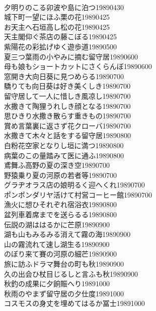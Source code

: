 \begin{multicols}{2}
\\夕明りのこる卯波や島に泊つ\hfill{19890430}
\\城下町一望にほふ栗の花\hfill{19890425}
\\お天主へ石垣高し松の花\hfill{19890425}
\\天主閣仰ぐ茶店の藤こぼる\hfill{19890425}
\\紫陽花の彩拡げゆく遊歩道\hfill{19890500}
\\夏三つ葉雨の小やみに摘む留守居\hfill{19890600}
\\母も娘もショートカットにさくらんぼ\hfill{19890600}
\\窓開き大向日葵に見つめらる\hfill{19890700}
\\驕りても向日葵は好き美くしき\hfill{19890700}
\\留守居して一人に惜しき風凉し\hfill{19890700}
\\水撒きて陶狸うれしき顔となる\hfill{19890700}
\\思ひきり水撒き散らす重きもの\hfill{19890700}
\\賞め言葉裏に返さず花クローバ\hfill{19890700}
\\水撒きて木々と話をする留守居\hfill{19890800}
\\白粉花空家となりし垣に満つ\hfill{19890800}
\\病葉のこの量踏みて医に通ふ\hfill{19890800}
\\鳶舞ふ高野の夏の深き空\hfill{19890700}
\\野猿乗り夏の河原の若者等\hfill{19890700}
\\グラヂオラス店の娘明るく迎へくれ\hfill{19890700}
\\ポンポンダリヤ活けて村営コーヒー館\hfill{19890700}
\\漁火に想ひそれぞれ宿浴衣\hfill{19890800}
\\盆列車着席までを送らるる\hfill{19890800}
\\伝説の湖ははるかに芒原\hfill{19890900}
\\湖も山もみるみる消えて霧の海\hfill{19890900}
\\山の霧流れて速し湖生る\hfill{19890900}
\\のぼり来て賽の河原の細芒\hfill{19890900}
\\旅に訪ふドラマ舞台の町も秋\hfill{19890900}
\\久の出会ひ杖目じるしと言ふも秋\hfill{19890900}
\\秋釣の成果に夕餉賑へり\hfill{19891000}
\\秋雨のやまず留守居の夕仕度\hfill{19891000}
\\コスモスの身丈を埋めてはるか冨士\hfill{19891000}

\end{multicols}
